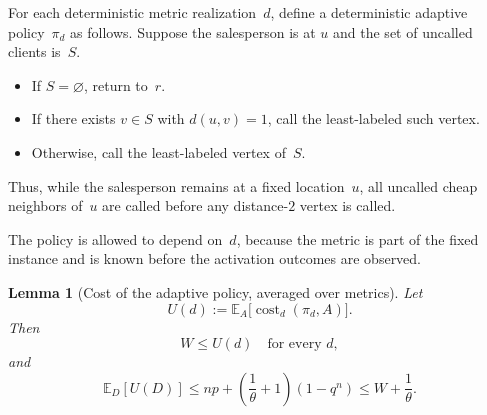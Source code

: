\documentclass[11pt]{article}
\newtheorem{lemma}[theorem]{Lemma}
\theoremstyle{remark}
\newcommand{\E}{\mathbb{E}}
\newcommand{\cost}{\operatorname{cost}}
\begin{document}
For each deterministic metric realization~$d$, define a deterministic adaptive
policy~$\pi_d$ as follows.  Suppose the salesperson is at $u$ and the set of
uncalled clients is~$S$.
\begin{itemize}
    \item If $S=\varnothing$, return to~$r$.
    \item If there exists $v\in S$ with $d(u,v)=1$, call the least-labeled such
    vertex.
    \item Otherwise, call the least-labeled vertex of~$S$.
\end{itemize}
Thus, while the salesperson remains at a fixed location~$u$, all uncalled cheap
neighbors of~$u$ are called before any distance-$2$ vertex is called.

The policy is allowed to depend on~$d$, because the metric is part of the fixed
instance and is known before the activation outcomes are observed.

\begin{lemma}[Cost of the adaptive policy, averaged over metrics]
\label{lem:adaptive-average}
Let
\[
    U(d):=\E_A\bigl[\cost_d(\pi_d,A)\bigr].
\]
Then
\[
    W\leq U(d)\quad\text{for every }d,
\]
and
\[
    \E_D[U(D)]
    \leq
    np+\left(\frac{1}{\theta}+1\right)(1-q^n)
    \leq W+\frac{1}{\theta}.
\]
\end{lemma}
\end{document}
